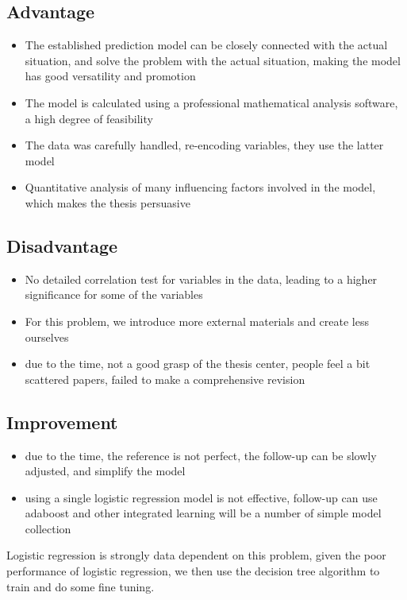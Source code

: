 \documentclass{mcmthesis}
\begin{document}
\subsection{Advantage}
\begin{itemize}
\item The established prediction model can be closely connected with the actual situation, and solve the problem with the actual situation, making the model has good versatility and promotion
\item The model is calculated using a professional mathematical analysis software, a high degree of feasibility
\item The data was carefully handled, re-encoding variables, they use the latter model
\item Quantitative analysis of many influencing factors involved in the model, which makes the thesis persuasive
\end{itemize}
\subsection{Disadvantage}
\begin{itemize}
\item No detailed correlation test for variables in the data, leading to a higher significance for some of the variables
\item For this problem, we introduce more external materials and create less ourselves
\item due to the time, not a good grasp of the thesis center, people feel a bit scattered papers, failed to make a comprehensive revision
\end{itemize}
\subsection{Improvement}
\begin{itemize}
\item due to the time, the reference is not perfect, the follow-up can be slowly adjusted, and simplify the model
\item using a single logistic regression model is not effective, follow-up can use adaboost and other integrated learning will be a number of simple model collection
\end{itemize}

Logistic regression is strongly data dependent on this problem, given the poor performance of logistic regression, we then use the decision tree algorithm to train and do some fine tuning.
\end{document}
